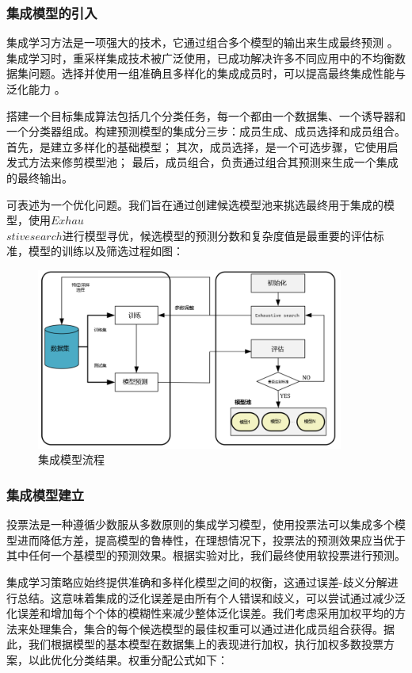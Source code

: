\documentclass[UTF8]{ctexart}
\begin{document}
\subsubsection{集成模型的引入}
集成学习方法是一项强大的技术，它通过组合多个模型的输出来生成最终预测 \cite{ref3} 。集成学习时，重采样集成技术被广泛使用，已成功解决许多不同应用中的不均衡数据集问题。选择并使用一组准确且多样化的集成成员时，可以提高最终集成性能与泛化能力\cite{ref4} 。

搭建一个目标集成算法包括几个分类任务，每一个都由一个数据集、一个诱导器和一个分类器组成。构建预测模型的集成分三步：成员生成、成员选择和成员组合。
首先，是建立多样化的基础模型；
其次，成员选择，是一个可选步骤，它使用启发式方法来修剪模型池；
最后，成员组合，负责通过组合其预测来生成一个集成的最终输出。


可表述为一个优化问题。我们旨在通过创建候选模型池来挑选最终用于集成的模型，使用$Exhau$ \\ $stive search$进行模型寻优，候选模型的预测分数和复杂度值是最重要的评估标准，模型的训练以及筛选过程如图：

\begin{figure}[H]\centering
	\includegraphics[width=0.9\textwidth]{img/集成模型流程.png} %
	\caption{集成模型流程} %
	\label{fig:figure 8} %
\end{figure}

\subsubsection{集成模型建立}
投票法是一种遵循少数服从多数原则的集成学习模型，使用投票法可以集成多个模型进而降低方差，提高模型的鲁棒性，在理想情况下，投票法的预测效果应当优于其中任何一个基模型的预测效果。根据实验对比，我们最终使用软投票进行预测。

集成学习策略应始终提供准确和多样化模型之间的权衡，这通过误差-歧义分解进行总结。这意味着集成的泛化误差是由所有个人错误和歧义，可以尝试通过减少泛化误差和增加每个个体的模糊性来减少整体泛化误差。我们考虑采用加权平均的方法来处理集合，集合的每个候选模型的最佳权重可以通过进化成员组合获得。据此，我们根据模型的基本模型在数据集上的表现进行加权，执行加权多数投票方案，以此优化分类结果。权重分配公式如下：
\end{document}
